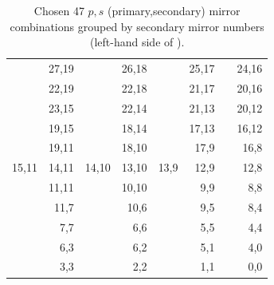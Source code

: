 \begin{table}[htb]
  \caption{
    Chosen 47 $p,s$ (primary,secondary) mirror combinations grouped by secondary mirror
    numbers (left-hand side of \richtwo).}
  \vspace{-0.5\baselineskip}
  \centering
  \small
  \sffamily
  \begin{tabular}{*{4}{|d{2}d{2}}|}
    \hline
           & 27,19 &       & 26,18 &       & 25,17 &       & 24,16 \\
           & 22,19 &       & 22,18 &       & 21,17 &       & 20,16 \\
    \hline
           & 23,15 &       & 22,14 &       & 21,13 &       & 20,12 \\
           & 19,15 &       & 18,14 &       & 17,13 &       & 16,12 \\
    \hline
           & 19,11 &       & 18,10 &       & 17,9  &       & 16,8  \\
     15,11 & 14,11 & 14,10 & 13,10 & 13,9  & 12,9  &       & 12,8  \\
           & 11,11 &       & 10,10 &       &  9,9  &       &  8,8  \\
    \hline
           & 11,7  &       & 10,6  &       &  9,5  &       &  8,4  \\
           &  7,7  &       &  6,6  &       &  5,5  &       &  4,4  \\
    \hline
           &  6,3  &       &  6,2  &       &  5,1  &       &  4,0  \\
           &  3,3  &       &  2,2  &       &  1,1  &       &  0,0  \\
    \hline
  \end{tabular}
  \label{tab:ChosenConbinationsSec}
  \vspace{-0.5\baselineskip}
\end{table}

